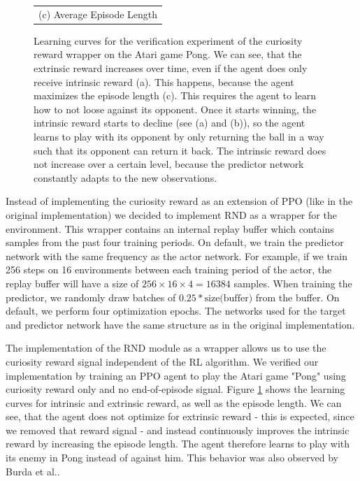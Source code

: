 \begin{figure}[htp]
\begin{center}
\begin{tabular}{c}
    {\small (c) Average Episode Length} \\
    \end{tabular}
    \end{center}
    \vspace*{-0.25cm}
    \caption[RND on Pong]{Learning curves for the verification experiment of the curiosity reward wrapper on the Atari game Pong. We can see, that the extrinsic reward increases over time, even if the agent does only receive intrinsic reward (a). This happens, because the agent maximizes the episode length (c). This requires the agent to learn how to not loose against its opponent. Once it starts winning, the intrinsic reward starts to decline (see (a) and (b)), so the agent learns to play with its opponent by only returning the ball in a way such that its opponent can return it back. The intrinsic reward does not increase over a certain level, because the predictor network constantly adapts to the new observations.}
    \label{fig:RNDPong}
  \end{figure}


Instead of implementing the curiosity reward as an extension of PPO (like in the original implementation) we decided to implement RND as a wrapper for the environment. This wrapper contains an internal replay buffer which contains samples from the past four training periods. On default, we train the predictor network with the same frequency as the actor network. For example, if we train 256 steps on 16 environments between each training period of the actor, the replay buffer will have a size of $256 \times 16 \times 4 = 16384$ samples. When training the predictor, we randomly draw batches of $0.25*\text{size(buffer)}$ from the buffer. On default, we perform four optimization epochs. The networks used for the target and predictor network have the same structure as in the original implementation.

The implementation of the RND module as a wrapper allows us to use the curiosity reward signal independent of the RL algorithm. We verified our implementation by training an PPO agent to play the Atari game "Pong" using curiosity reward only and no end-of-episode signal. Figure \ref{fig:RNDPong} shows the learning curves for intrinsic and extrinsic reward, as well as the episode length. We can see, that the agent does not optimize for extrinsic reward - this is expected, since we removed that reward signal - and instead continuously improves the intrinsic reward by increasing the episode length. The agent therefore learns to play with its enemy in Pong instead of against him. This behavior was also observed by Burda et al.\cite{burda2018exploration}.

